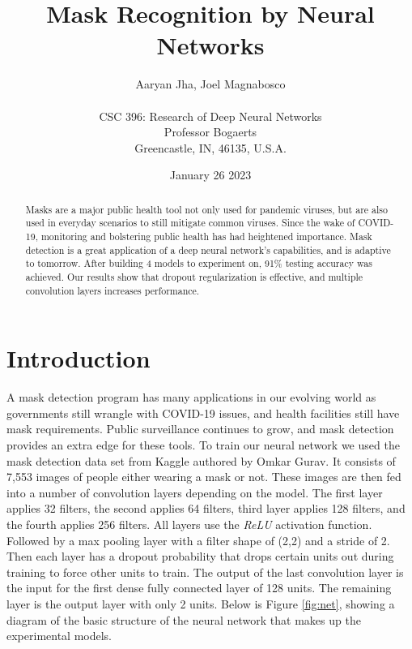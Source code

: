 \documentclass[twocolumn,letterpaper,10pt]{article}
\title{Mask Recognition by Neural Networks}
\author{Aaryan Jha, Joel Magnabosco \\
\\ 
CSC 396: Research of Deep Neural Networks\\
Professor Bogaerts\\
Greencastle, IN, 46135, U.S.A.\\
}
\date{January 26 2023}
\begin{document}
\maketitle

\begin{abstract}
Masks are a major public health tool not only used for pandemic viruses, but are also used in everyday scenarios to still mitigate common viruses. Since the wake of COVID-19, monitoring and bolstering public health has had heightened importance. Mask detection is a great application of a deep neural network's capabilities, and is adaptive to tomorrow. After building 4 models to experiment on, 91\% testing accuracy was achieved. Our results show that dropout regularization is effective, and multiple convolution layers increases performance.
\end{abstract}

\section{Introduction}
\label{intro}
A mask detection program has many applications in our evolving world as governments still wrangle with COVID-19 issues, and health facilities still have mask requirements. Public surveillance continues to grow, and mask detection provides an extra edge for these tools. To train our neural network we used the mask detection data set from Kaggle authored by Omkar Gurav\cite{kaggle}. It consists of 7,553 images of people either wearing a mask or not. These images are then fed into a number of convolution layers depending on the model. The first layer applies 32 filters, the second applies 64 filters, third layer applies 128 filters, and the fourth applies 256 filters. All layers use the {\it ReLU} activation function. Followed by a max pooling layer with a filter shape of (2,2) and a stride of 2. Then each layer has a dropout probability that drops certain units out during training to force other units to train. The output of the last convolution layer is the input for the first dense fully connected layer of 128 units. The remaining layer is the output layer with only 2 units. Below is Figure \ref{fig:net}, showing a diagram of the basic structure of the neural network that makes up the experimental models. 
\end{document}
